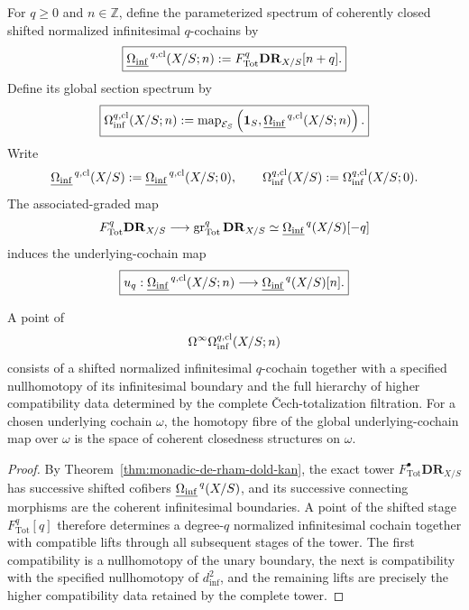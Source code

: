 \begin{definition}
\label{def:coherently-closed-form-spectrum}
For \(q\geq0\) and \(n\in\mathbb Z\), define the parameterized spectrum of coherently closed shifted normalized infinitesimal
\(q\)-cochains by
\[
\boxed{
    \underline{\Omega_{\mathrm{inf}}}^{\,q,\mathrm{cl}}(X/S;n)
    :=
    F_{\mathrm{Tot}}^q\mathbf{DR}_{X/S}[n+q].
}
\]
Define its global section spectrum by
\[
\boxed{
    \Omega_{\mathrm{inf}}^{q,\mathrm{cl}}(X/S;n)
    :=
    \operatorname{map}_{\mathcal E_S}
    \left(
        \mathbf 1_S,
        \underline{\Omega_{\mathrm{inf}}}^{\,q,\mathrm{cl}}(X/S;n)
    \right).
}
\]
Write
\[
    \underline{\Omega_{\mathrm{inf}}}^{\,q,\mathrm{cl}}(X/S)
    :=
    \underline{\Omega_{\mathrm{inf}}}^{\,q,\mathrm{cl}}(X/S;0),
    \qquad
    \Omega_{\mathrm{inf}}^{q,\mathrm{cl}}(X/S)
    :=
    \Omega_{\mathrm{inf}}^{q,\mathrm{cl}}(X/S;0).
\]
The associated-graded map
\[
    F_{\mathrm{Tot}}^q\mathbf{DR}_{X/S}
    \longrightarrow
    \operatorname{gr}_{\mathrm{Tot}}^q\mathbf{DR}_{X/S}
    \simeq
    \underline{\Omega_{\mathrm{inf}}}^{\,q}(X/S)[-q]
\]
induces the underlying-cochain map
\[
\boxed{
    u_q:
    \underline{\Omega_{\mathrm{inf}}}^{\,q,\mathrm{cl}}(X/S;n)
    \longrightarrow
    \underline{\Omega_{\mathrm{inf}}}^{\,q}(X/S)[n].
}
\]
\end{definition}

\begin{proposition}
\label{prop:closedness-coherent-structure}
A point of
\[
    \Omega^\infty\Omega_{\mathrm{inf}}^{q,\mathrm{cl}}(X/S;n)
\]
consists of a shifted normalized infinitesimal \(q\)-cochain together with a specified nullhomotopy of its infinitesimal boundary and
the full hierarchy of higher compatibility data determined by the complete \v{C}ech-totalization filtration.  For a
chosen underlying cochain \(\omega\), the homotopy fibre of the global underlying-cochain map over
\(\omega\) is the space of coherent closedness structures on \(\omega\).
\end{proposition}

\begin{proof}
By Theorem~\ref{thm:monadic-de-rham-dold-kan}, the exact tower
\(F_{\mathrm{Tot}}^\bullet\mathbf{DR}_{X/S}\) has successive shifted cofibers
\(\underline{\Omega_{\mathrm{inf}}}^{\,q}(X/S)\), and its successive connecting morphisms are the coherent infinitesimal
boundaries.  A point of the shifted stage \(F_{\mathrm{Tot}}^q[q]\) therefore determines a degree-\(q\) normalized infinitesimal cochain
together with compatible lifts through all subsequent stages of the tower.  The first compatibility
is a nullhomotopy of the unary boundary, the next is compatibility with the specified nullhomotopy
of \(d_{\inf}^2\), and the remaining lifts are precisely the higher compatibility data retained by
the complete tower.
\end{proof}

